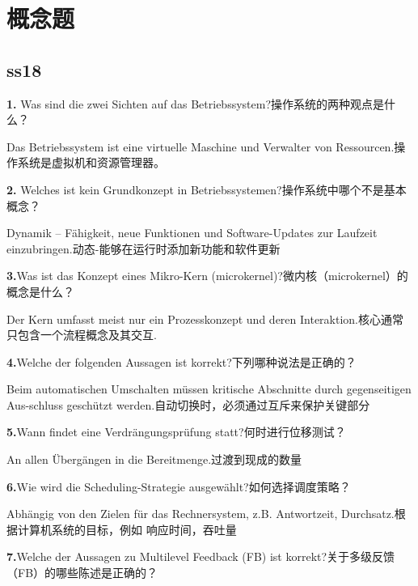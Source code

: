\documentclass[fleqn]{article}
\begin{document}



\pagestyle{main}

\section{概念题}

\subsection{ss18}

\textbf{1.} Was sind die zwei Sichten auf das Betriebssystem?操作系统的两种观点是什么？

Das Betriebssystem ist eine virtuelle Maschine und Verwalter von Ressourcen.操作系统是虚拟机和资源管理器。

\textbf{2.} Welches ist kein Grundkonzept in Betriebssystemen?操作系统中哪个不是基本概念？

Dynamik – Fähigkeit, neue Funktionen und Software-Updates zur Laufzeit einzubringen.动态-能够在运行时添加新功能和软件更新

\textbf{3.}Was ist das Konzept eines Mikro-Kern (microkernel)?微内核（microkernel）的概念是什么？

Der Kern umfasst meist nur ein Prozesskonzept und deren Interaktion.核心通常只包含一个流程概念及其交互.

\textbf{4.}Welche der folgenden Aussagen ist korrekt?下列哪种说法是正确的？

Beim automatischen Umschalten müssen kritische Abschnitte durch gegenseitigen Aus-schluss geschützt werden.自动切换时，必须通过互斥来保护关键部分

\textbf{5.}Wann findet eine Verdrängungsprüfung statt?何时进行位移测试？

An allen Übergängen in die Bereitmenge.过渡到现成的数量

\textbf{6.}Wie wird die Scheduling-Strategie ausgewählt?如何选择调度策略？

Abhängig von den Zielen für das Rechnersystem, z.B. Antwortzeit, Durchsatz.根据计算机系统的目标，例如 响应时间，吞吐量

\textbf{7.}Welche der Aussagen zu Multilevel Feedback (FB) ist korrekt?关于多级反馈（FB）的哪些陈述是正确的？
\end{document}

